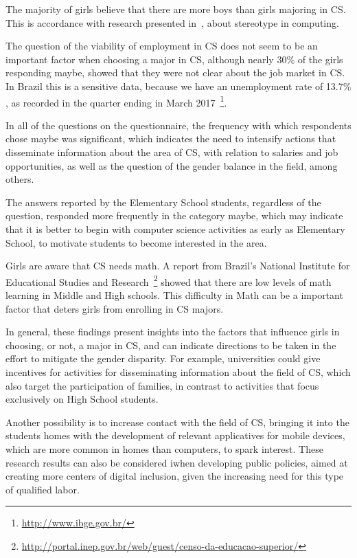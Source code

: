 The majority of girls believe that there are more boys than girls majoring in CS. This is accordance with research presented in~\cite{Mercier_2006}, about stereotype in computing.

The question of the viability of employment in CS does not seem to be an important factor when choosing a major in CS, although nearly 30\% of the girls responding maybe, showed that they were not clear about the job market in CS. In Brazil this is a sensitive data, because we have an unemployment rate of 13.7\% , as recorded in the quarter ending in March 2017~\footnote{\url{http://www.ibge.gov.br/}}.

In all of the questions on the questionnaire, the frequency with which respondents chose maybe was significant, which indicates the need to intensify actions that disseminate information about the area of CS, with relation to salaries and job opportunities, as well as the question of the gender balance in the field, among others.

The answers reported by the Elementary School students, regardless of the question, responded more frequently in the category maybe, which may indicate that it is better to begin with computer science activities as early as Elementary School, to motivate students to become interested in the area.

Girls are aware that CS needs math. A report from Brazil's National Institute for Educational Studies and Research~\footnote{\url{http://portal.inep.gov.br/web/guest/censo-da-educacao-superior/}} showed that there are low levels of math learning in Middle and High schools. This difficulty in Math can be a important factor that deters girls from enrolling in CS majors.

In general, these findings present insights into the factors that influence girls in choosing, or not, a major in CS, and can indicate directions to be taken in the effort to mitigate the gender disparity. For example, universities could give incentives for activities for disseminating information about the field of CS, which also target the participation of families, in contrast to activities that focus exclusively on High School students.

Another possibility is to increase contact with the field of CS, bringing it into the students homes with the development of relevant applicatives for mobile devices, which are more common in homes than computers, to spark interest. These research results can also be considered iwhen developing public policies, aimed at creating more centers of digital inclusion, given the increasing need for this type of qualified labor.

